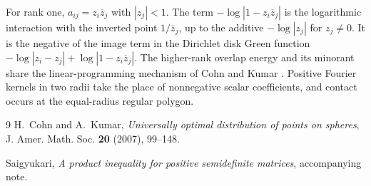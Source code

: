 \documentclass[10pt,twoside,reqno]{amsart}
\numberwithin{equation}{section}
\begin{document}
For rank one, \(a_{ij}=z_i\overline z_j\) with \(|z_j|<1\).
The term \(-\log|1-z_i\overline z_j|\) is the logarithmic interaction
with the inverted point \(1/\overline z_j\), up to the additive
\(-\log|z_j|\) for \(z_j\ne0\). It is the negative of the image term in
the Dirichlet disk Green function
\(-\log|z_i-z_j|+\log|1-z_i\overline z_j|\).
The higher-rank overlap energy and its minorant share the
linear-programming mechanism of Cohn and Kumar \cite{CK}.
Positive Fourier kernels in two radii take the place of nonnegative
scalar coefficients, and contact occurs at the equal-radius regular polygon.

\begin{thebibliography}{9}
H.~Cohn and A.~Kumar, \textit{Universally optimal distribution of points on
spheres}, J. Amer. Math. Soc. \textbf{20} (2007), 99--148.

Saigyukari, \textit{A product inequality for positive semidefinite
matrices}, accompanying note.
\end{thebibliography}
\end{document}
